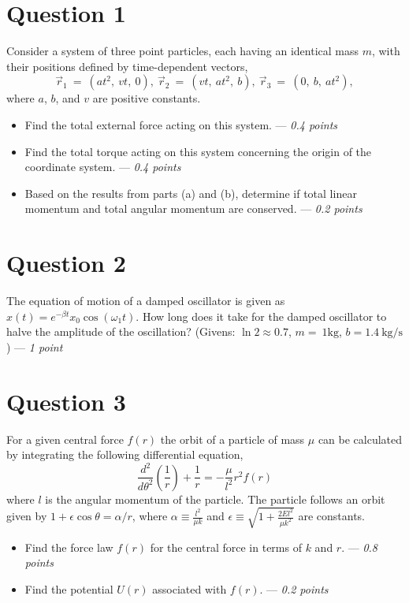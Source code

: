 \documentclass[a4paper,12pt]{article}
\begin{document}
\section*{Question 1}
Consider a system of three point particles, each having an identical mass $m$, with their positions defined by time-dependent vectors,
\begin{equation*}
    \vec r_{1}~=~(at^2,~vt,~0),~\vec r_{2}~=~(vt,~at^2,~b),~\vec r_{3}~=~(0,~b,~at^2), 
\end{equation*}
where $a$, $b$, and $v$ are positive constants.
\begin{itemize}
    \item[\textbf{a.}] Find the total external force acting on this system. --- \textit{0.4 points}
    \item[\textbf{b.}] Find the total torque acting on this system concerning the origin of the coordinate system. --- \textit{0.4 points}
    \item[\textbf{c.}] Based on the results from parts (a) and (b), determine if total linear momentum and total angular momentum are conserved. --- \textit{0.2 points}
\end{itemize}

\section*{Question 2}
The equation of motion of a damped oscillator is given as $x(t)=e^{-\beta t}x_0\cos{\left(\omega_1 t\right)}$. How long does it take for the damped oscillator to halve the amplitude of the oscillation? 
(Givens: $\ln2\approx 0.7$, $m=~1\text{kg}$, $b=1.4~\text{kg/s}$) --- \textit{1 point}

\section*{Question 3}
For a given central force $f(r)$ the orbit of a particle of mass $\mu$ can be calculated by integrating the following differential equation,
\begin{equation*}
    \dfrac{d^2}{d\theta^2}\left(\frac{1}{r}\right)+\frac{1}{r}=-\frac{\mu}{l^2}r^2f(r)
\end{equation*}
where $l$ is the angular momentum of the particle. The particle follows an orbit given by $1+\epsilon\cos\theta=\alpha/r$, where $\alpha\equiv \frac{l^2}{\mu k}$ and $\epsilon \equiv \sqrt{1+\frac{2El^2}{\mu k^2}}$ are constants.

\begin{itemize}
    \item[\textbf{a.}] Find the force law $f(r)$ for the central force in terms of $k$ and $r$. --- \textit{0.8 points}
    \item[\textbf{b.}] Find the potential $U(r)$ associated with $f(r)$. --- \textit{0.2 points}
\end{itemize}
\end{document}
